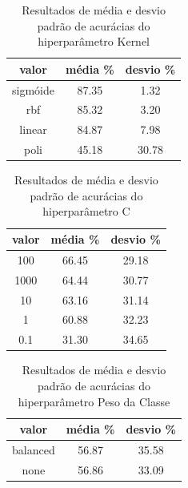 \begin{table}[!htpp]
	\vspace{0.3cm}
  \caption{Resultados de média e desvio padrão de acurácias do hiperparâmetro Kernel}
	\vspace{-0.6cm}
	\label{tab04}
	\renewcommand{\arraystretch}{1.2}
	\begin{center}
\begin{tabular}{ccc}
\hline
\textbf{valor} &	\textbf{média \%}	& \textbf{desvio \%}\\
\hline		
      sigmóide & 87.35 & 1.32 \\
    rbf & 85.32 & 3.20 \\
 linear & 84.87 & 7.98 \\
   poli & 45.18 & 30.78 \\
\hline
\end{tabular}
\end{center}
\end{table}

\begin{table}[!htpp]
	\vspace{0.3cm}
  \caption{Resultados de média e desvio padrão de acurácias do hiperparâmetro C}
	\vspace{-0.6cm}
	\label{tab05}
	\renewcommand{\arraystretch}{1.2}
	\begin{center}
\begin{tabular}{ccc}
\hline
\textbf{valor} &	\textbf{média \%}	& \textbf{desvio \%}\\
\hline		
 100 & 66.45 & 29.18 \\
1000 & 64.44 & 30.77 \\
  10 & 63.16 & 31.14 \\
   1 & 60.88 & 32.23 \\
   0.1 & 31.30 & 34.65 \\
\hline
\end{tabular}
\end{center}
\end{table}

\begin{table}[!htpp]
	\vspace{0.3cm}
  \caption{Resultados de média e desvio padrão de acurácias do hiperparâmetro Peso da Classe}
	\vspace{-0.6cm}
	\label{tab06}
	\renewcommand{\arraystretch}{1.2}
	\begin{center}
\begin{tabular}{ccc}
\hline
\textbf{valor} &	\textbf{média \%}	& \textbf{desvio \%}\\
\hline		
    balanced & 56.87 & 35.58 \\
        none & 56.86 & 33.09 \\
\hline
\end{tabular}
\end{center}
\end{table}

